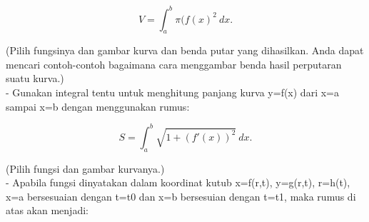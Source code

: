 \documentclass[a4paper,10pt]{article}
\begin{document}
\begin{eulernotebook}
\begin{eulercomment}
\begin{eulercomment}
\begin{eulercomment}
\begin{eulercomment}
\begin{eulercomment}
\begin{eulercomment}
\begin{eulercomment}
\begin{eulercomment}
\begin{eulercomment}
\begin{eulercomment}
\begin{eulercomment}
\begin{eulercomment}
\begin{eulercomment}
\begin{eulercomment}
\begin{eulercomment}
\begin{eulercomment}
\begin{eulercomment}
\begin{eulercomment}
\begin{eulercomment}
\begin{eulercomment}
\begin{eulercomment}
\end{eulercomment}
\begin{eulerformula}
\[
V = \int_a^b \pi (f(x)^2\ dx.
\]
\end{eulerformula}
\begin{eulercomment}
(Pilih fungsinya dan gambar kurva dan benda putar yang dihasilkan. Anda dapat mencari contoh-contoh bagaimana cara menggambar
benda hasil perputaran suatu kurva.)\\
- Gunakan integral tentu untuk menghitung panjang kurva y=f(x) dari x=a sampai x=b dengan menggunakan rumus:

\end{eulercomment}
\begin{eulerformula}
\[
S = \int_a^b \sqrt{1+(f'(x))^2} \ dx.
\]
\end{eulerformula}
\begin{eulercomment}
(Pilih fungsi dan gambar kurvanya.)\\
- Apabila fungsi dinyatakan dalam koordinat kutub x=f(r,t), y=g(r,t), r=h(t), x=a bersesuaian dengan t=t0 dan x=b bersesuian
dengan t=t1, maka rumus di atas akan menjadi:


\end{eulercomment}
\end{eulercomment}
\end{eulercomment}
\end{eulercomment}
\end{eulercomment}
\end{eulercomment}
\end{eulercomment}
\end{eulercomment}
\end{eulercomment}
\end{eulercomment}
\end{eulercomment}
\end{eulercomment}
\end{eulercomment}
\end{eulercomment}
\end{eulercomment}
\end{eulercomment}
\end{eulercomment}
\end{eulercomment}
\end{eulercomment}
\end{eulercomment}
\end{eulercomment}
\end{eulernotebook}
\end{document}
